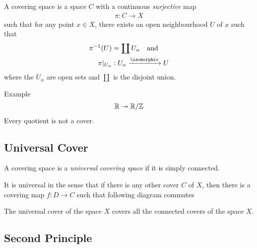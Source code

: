 A covering space is a space $C$ with a continuous \emph{surjective} map 
\begin{align}
    \pi: C\to X
\end{align}
such that for any point $x\in X$, there exists an open neighbourhood $U$ of $x$ such that 
\begin{align}
    \pi^{-1}(U)   &=  \coprod U_\alpha \quad\text{and}\\
    \pi|_{U_\alpha}&: U_\alpha \xrightarrow{\isomorphic} U
\end{align}
where the $U_\alpha$ are open sets and $\coprod$ is the disjoint union.
\begin{insight}
    Example 
    \begin{align}
        \mathbb{R}\twoheadrightarrow \mathbb{R}/\mathbb{Z}
    \end{align}
    Every quotient is not a cover.
\end{insight}

\subsection{Universal Cover}
\label{sub:universal_cover}


A covering space is a \emph{universal covering space} if it is simply connected. 

It is universal in the sense that if there is any other cover $C$ of $X$, then there is a covering map $f: D\to C$ such that following diagram commutes
\begin{center}
\end{center}

\begin{insight}
   The universal cover of the space $X$ covers all the connected covers of the space $X$.
\end{insight}

\subsection{Second Principle}
\label{sub:second_principle}

